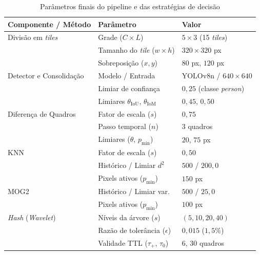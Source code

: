 \documentclass{ieeeaccess}
\begin{document}
\begin{table}[t!]
\caption{Parâmetros finais do pipeline e das estratégias de decisão}
\label{tab:parametros}
\centering
\setlength{\tabcolsep}{4pt}
\begin{tabular}{lll}
\toprule
\textbf{Componente / Método} & \textbf{Parâmetro} & \textbf{Valor} \\
\midrule
Divisão em \textit{tiles} & Grade ($C \times L$) & $5 \times 3$ (15 \textit{tiles}) \\
                          & Tamanho do \textit{tile} ($w \times h$) & $320 \times 320$ px \\
                          & Sobreposição ($x, y$) & $80$ px, $120$ px \\
\midrule
Detector e Consolidação   & Modelo / Entrada & YOLOv8n / $640 \times 640$ \\
                          & Limiar de confiança & $0{,}25$ (classe \textit{person}) \\
                          & Limiares $\theta_{\mathrm{IoU}}$, $\theta_{\mathrm{IoM}}$ & $0{,}45$, $0{,}50$ \\
\midrule
Diferença de Quadros      & Fator de escala ($s$) & $0{,}75$ \\
                          & Passo temporal ($n$) & $3$ quadros \\
                          & Limiares ($\theta$, $p_{\min}$) & $20$, $75$ px \\
\midrule
KNN                       & Fator de escala ($s$) & $0{,}50$ \\
                          & Histórico / Limiar $d^2$ & $500$ / $200{,}0$ \\
                          & Pixels ativos ($p_{\min}$) & $150$ px \\
\midrule
MOG2                      & Histórico / Limiar var. & $500$ / $25{,}0$ \\
                          & Pixels ativos ($p_{\min}$) & $100$ px \\
\midrule
\textit{Hash} (\textit{Wavelet}) & Níveis da árvore ($s$) & $(5, 10, 20, 40)$ \\
                          & Razão de tolerância ($\epsilon$) & $0{,}015$ ($1{,}5\%$) \\
                          & Validade TTL ($\tau_{+}$, $\tau_{0}$) & $6$, $30$ quadros \\
\bottomrule
\end{tabular}
\end{table}
\end{document}
